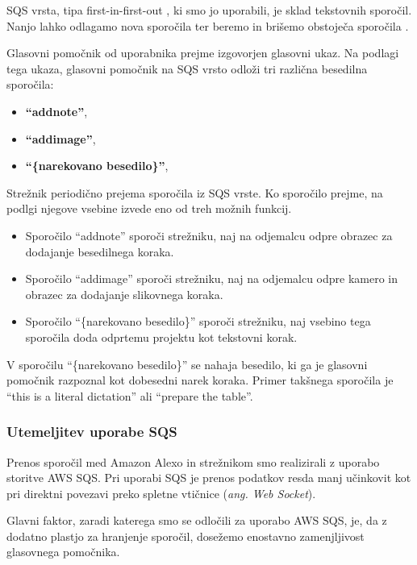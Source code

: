 \documentclass[a4paper, 12pt]{book}
\begin{document}
SQS vrsta, tipa first-in-first-out \cite{sqsfifo}, ki smo jo uporabili, je sklad tekstovnih sporočil.
Nanjo lahko odlagamo nova sporočila ter beremo in brišemo obstoječa sporočila .


Glasovni pomočnik od uporabnika prejme izgovorjen glasovni ukaz.
Na podlagi tega ukaza, glasovni pomočnik na SQS vrsto odloži tri različna besedilna sporočila:
\begin{itemize}
	\item \textbf{\enquote{addnote}},
	\item \textbf{\enquote{addimage}},
	\item \textbf{\enquote{\{narekovano besedilo\}}},
\end{itemize}

Strežnik periodično prejema sporočila iz SQS vrste.
Ko sporočilo prejme, na podlgi njegove vsebine izvede eno od treh možnih funkcij.

\begin{itemize}
	\item Sporočilo \enquote{addnote} sporoči strežniku, naj na odjemalcu odpre obrazec za dodajanje besedilnega koraka.
	\item Sporočilo \enquote{addimage} sporoči strežniku, naj na odjemalcu odpre kamero in obrazec za dodajanje slikovnega koraka.
	\item Sporočilo \enquote{\{narekovano besedilo\}} sporoči strežniku, naj vsebino tega sporočila doda odprtemu projektu kot tekstovni korak.
\end{itemize}

V sporočilu \enquote{\{narekovano besedilo\}} se nahaja besedilo, ki ga je glasovni pomočnik razpoznal kot dobesedni narek koraka.
Primer takšnega sporočila je \enquote{this is a literal dictation} ali \enquote{prepare the table}.

\subsubsection{Utemeljitev uporabe SQS}

Prenos sporočil med Amazon Alexo in strežnikom smo realizirali z uporabo storitve AWS SQS.
Pri uporabi SQS je prenos podatkov resda manj učinkovit kot pri direktni povezavi preko spletne vtičnice (\textit{ang. Web Socket}).

Glavni faktor, zaradi katerega smo se odločili za uporabo AWS SQS, je, da z dodatno plastjo za hranjenje sporočil, dosežemo enostavno zamenjljivost glasovnega pomočnika.
\end{document}
